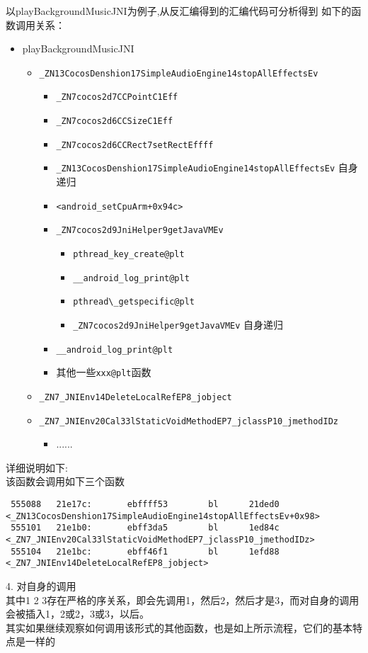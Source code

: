 以playBackgroundMusicJNI为例子,从反汇编得到的汇编代码可分析得到
如下的函数调用关系：
\begin{itemize}
\item playBackgroundMusicJNI
  	\begin{itemize}
  	\item \verb|_ZN13CocosDenshion17SimpleAudioEngine14stopAllEffectsEv|
		\begin{itemize}
  		\item \verb|_ZN7cocos2d7CCPointC1Eff|
   		\item \verb|_ZN7cocos2d6CCSizeC1Eff|
   		\item \verb|_ZN7cocos2d6CCRect7setRectEffff|
  		\item \verb|_ZN13CocosDenshion17SimpleAudioEngine14stopAllEffectsEv| 
		自身递归
		\item \verb|<android_setCpuArm+0x94c>|
		\item \verb|_ZN7cocos2d9JniHelper9getJavaVMEv|
  			\begin{itemize}
 			\item \verb|pthread_key_create@plt|
  			\item \verb|__android_log_print@plt|
  			\item \verb|pthread\_getspecific@plt|
  			\item \verb|_ZN7cocos2d9JniHelper9getJavaVMEv| 自身递归
  			\end{itemize}
		\item \verb|__android_log_print@plt|
		\item 其他一些\verb|xxx@plt|函数
		\end{itemize}
   	\item \verb|_ZN7_JNIEnv14DeleteLocalRefEP8_jobject|
   	\item \verb|_ZN7_JNIEnv20Cal33lStaticVoidMethodEP7_jclassP10_jmethodIDz|
  		\begin{itemize}
  		\item ......
  		\end{itemize}
	\end{itemize}
\end{itemize}
详细说明如下:\\
该函数会调用如下三个函数\\
\begin{lstlisting}
 555088   21e17c:       ebffff53        bl      21ded0 <_ZN13CocosDenshion17SimpleAudioEngine14stopAllEffectsEv+0x98>
 555101   21e1b0:       ebff3da5        bl      1ed84c <_ZN7_JNIEnv20Cal33lStaticVoidMethodEP7_jclassP10_jmethodIDz>
 555104   21e1bc:       ebff46f1        bl      1efd88 <_ZN7_JNIEnv14DeleteLocalRefEP8_jobject>
\end{lstlisting}
 4.  对自身的调用\\
其中1 2 3存在严格的序关系，即会先调用1，然后2，然后才是3，而对自身的调用会被插入1，2或2，3或3，以后。\\
其实如果继续观察如何调用该形式的其他函数，也是如上所示流程，它们的基本特点是一样的\\


